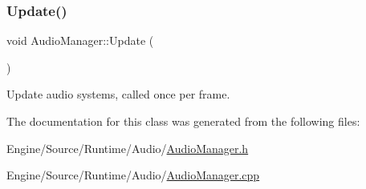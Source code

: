 \subsubsection{\texorpdfstring{Update()}{Update()}}
{\footnotesize\ttfamily void Audio\+Manager\+::\+Update (\begin{DoxyParamCaption}{ }\end{DoxyParamCaption})}

Update audio systems, called once per frame. 

The documentation for this class was generated from the following files\+:\begin{DoxyCompactItemize}
\item 
Engine/\+Source/\+Runtime/\+Audio/\mbox{\hyperlink{_audio_manager_8h}{Audio\+Manager.\+h}}\item 
Engine/\+Source/\+Runtime/\+Audio/\mbox{\hyperlink{_audio_manager_8cpp}{Audio\+Manager.\+cpp}}\end{DoxyCompactItemize}

